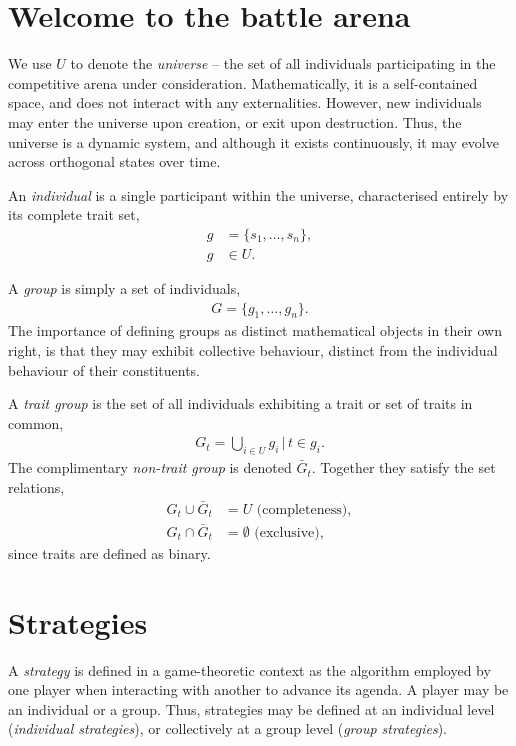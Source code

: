 \documentclass[twocolumn, aps, rmp, amsmath, amssymb, nofootinbib, superscriptaddress, longbibliography, floatfix, table-of-contents, eqsecnum]{revtex4-1}
\begin{document}
\section{Welcome to the battle arena}

We use $U$ to denote the \textit{universe} -- the set of all individuals participating in the competitive arena under consideration. Mathematically, it is a self-contained space, and does not interact with any externalities. However, new individuals may enter the universe upon creation, or exit upon destruction. Thus, the universe is a dynamic system, and although it exists continuously, it may evolve across orthogonal states over time.

An \textit{individual} is a single participant within the universe, characterised entirely by its complete trait set,
\begin{align}
	g &= \{s_1,\dots,s_n\},\nonumber\\
	g &\in U.
\end{align}

A \textit{group} is simply a set of individuals,
\begin{align}
	G = \{g_1,\dots,g_n\}.	
\end{align}
The importance of defining groups as distinct mathematical objects in their own right, is that they may exhibit collective behaviour, distinct from the individual behaviour of their constituents.

A \textit{trait group} is the set of all individuals exhibiting a trait or set of traits in common,
\begin{align}
	G_t = \bigcup_{i\in U} g_i \,|\, t\in g_i.
\end{align}
The complimentary \textit{non-trait group} is denoted $\bar G_t$. Together they satisfy the set relations,
\begin{align}
G_t \cup \bar G_t &= U \,\,\text{(completeness)},\nonumber\\
G_t \cap \bar G_t &= \emptyset \,\,\text{(exclusive)},
\end{align}
since traits are defined as binary.

\section{Strategies}

A \textit{strategy} is defined in a game-theoretic context as the algorithm employed by one player when interacting with another to advance its agenda. A player may be an individual or a group. Thus, strategies may be defined at an individual level (\textit{individual strategies}), or collectively at a group level (\textit{group strategies}).
\end{document}
